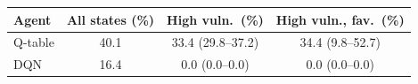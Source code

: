 \begin{tabular}{@{}lccc@{}}
\toprule
Agent & All states (\%) & High vuln.\ (\%) & High vuln., fav.\ (\%) \\
\midrule
Q-table & 40.1 & 33.4 (29.8--37.2) & 34.4 (9.8--52.7) \\
DQN & 16.4 & 0.0 (0.0--0.0) & 0.0 (0.0--0.0) \\
\bottomrule
\end{tabular}
